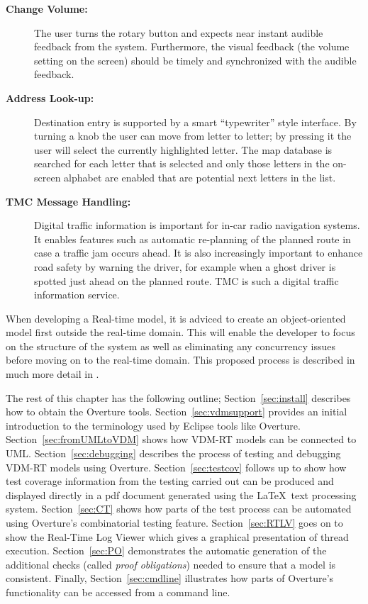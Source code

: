 \begin{description}
\item[\textbf{Change Volume:}] The user turns the rotary button and expects near instant audible feedback from the system. Furthermore, the visual feedback
(the volume setting on the screen) should be timely and synchronized with the
audible feedback.
\item[\textbf{Address Look-up:}] Destination entry is supported by a smart ``typewriter'' style interface. By turning a knob the user can move from letter to letter; by pressing it the user will select the currently highlighted letter. The map database is searched for each letter that is selected and only those letters in the on-screen alphabet are enabled that are potential next letters in the list.
\item[\textbf{TMC Message Handling:}] Digital traffic information is important for in-car radio navigation systems. It enables features such as automatic re-planning of the planned route in case a traffic jam occurs ahead. It is also increasingly important to enhance road safety by warning the driver, for example when a ghost driver is spotted just ahead on the planned route. TMC is such a digital traffic information service.
\end{description}

When developing a Real-time model, it is adviced to create an object-oriented model first outside the real-time domain. This will enable the developer to focus on the structure of the system as well as eliminating any concurrency issues before moving on to the real-time domain. This proposed process is described in much more detail in \cite{Larsen&09b}.

The rest of this chapter has the following outline; Section~\ref{sec:install} describes how to obtain the Overture tools.
Section~\ref{sec:vdmsupport} provides an initial introduction to the
terminology used by Eclipse tools like Overture. 
Section~\ref{sec:fromUMLtoVDM} shows how VDM-RT models can be
connected to UML.
Section~\ref{sec:debugging} describes the process of testing and
debugging VDM-RT models using Overture.
Section~\ref{sec:testcov} follows up to show how test coverage
information from the testing carried out can be produced and displayed
directly in a pdf document generated using the \LaTeX\ text processing
system. 
Section~\ref{sec:CT} shows how parts of the test process can be
automated using Overture's combinatorial testing feature.
 Section~\ref{sec:RTLV} goes on
to show the Real-Time Log Viewer which gives a graphical presentation
of thread execution.
Section~\ref{sec:PO} demonstrates the automatic generation of the
additional checks (called \emph{proof obligations}) needed to ensure
that a model is consistent.  Finally, Section~\ref{sec:cmdline}
illustrates how parts of Overture's functionality can be accessed from
a command line.

